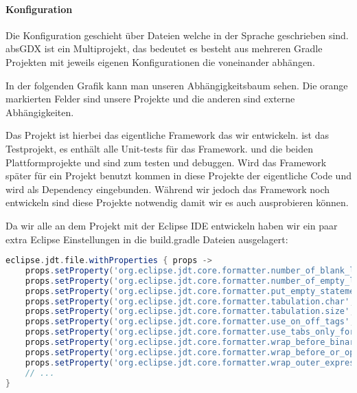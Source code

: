\paragraph{Konfiguration}

Die Konfiguration geschieht über  Dateien welche in der Sprache  geschrieben sind.
absGDX ist ein Multiprojekt, das bedeutet es besteht aus mehreren Gradle Projekten mit jeweils eigenen Konfigurationen die voneinander abhängen.

In der folgenden Grafik kann man unseren Abhängigkeitsbaum sehen. Die orange markierten Felder sind unsere Projekte und die anderen sind externe Abhängigkeiten.


Das Projekt  ist hierbei das eigentliche Framework das wir entwickeln.  ist das Testprojekt, es enthält alle Unit-tests für das Framework.
 und die beiden Plattformprojekte  und  sind zum testen und debuggen. Wird das Framework später für ein Projekt benutzt kommen in diese Projekte der eigentliche Code und  wird als Dependency eingebunden. Während wir jedoch das Framework noch entwickeln sind diese Projekte notwendig damit wir es auch ausprobieren können.

Da wir alle an dem Projekt mit der Eclipse IDE entwickeln haben wir ein paar extra Eclipse Einstellungen in die build.gradle Dateien ausgelagert:

\doinline %
\begin{lstlisting}[caption=Eclipse Optionen in gradle setzen, title=\hspace{0 pt}, language=groovy]
eclipse.jdt.file.withProperties { props ->
    props.setProperty('org.eclipse.jdt.core.formatter.number_of_blank_lines_at_beginning_of_method_body', '0')
    props.setProperty('org.eclipse.jdt.core.formatter.number_of_empty_lines_to_preserve', '1')
    props.setProperty('org.eclipse.jdt.core.formatter.put_empty_statement_on_new_line', 'true')
    props.setProperty('org.eclipse.jdt.core.formatter.tabulation.char', 'tab')
    props.setProperty('org.eclipse.jdt.core.formatter.tabulation.size', '4')
    props.setProperty('org.eclipse.jdt.core.formatter.use_on_off_tags', 'false')
    props.setProperty('org.eclipse.jdt.core.formatter.use_tabs_only_for_leading_indentations', 'false')
    props.setProperty('org.eclipse.jdt.core.formatter.wrap_before_binary_operator', 'true')
    props.setProperty('org.eclipse.jdt.core.formatter.wrap_before_or_operator_multicatch', 'true')
    props.setProperty('org.eclipse.jdt.core.formatter.wrap_outer_expressions_when_nested', 'true')
    // ...
}
\end{lstlisting}

